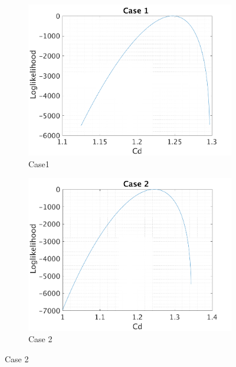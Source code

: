 \documentclass{article}
\begin{document}
\begin{figure}[H]
\captionsetup[subfigure]{justification=centering}
\begin{center}
  \begin{subfigure}{0.4\textwidth}
    \centering\includegraphics[width=1.1\textwidth,keepaspectratio]{images/inverse_problem/infer_drag/case1/cd_likelihood.png}
    \caption{\centering Case1}
  \end{subfigure}
   \begin{subfigure}{0.4\textwidth}
    \centering\includegraphics[width=1.1\textwidth,keepaspectratio]{images/inverse_problem/infer_drag/case2/cd_likelihood.png}
    \caption{\centering Case 2}
  \end{subfigure}

\end{center}
\end{figure}
\end{document}
